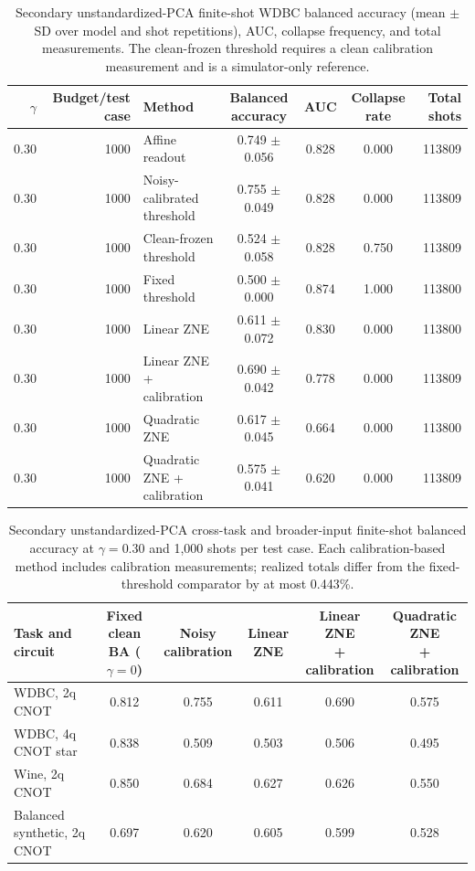 \documentclass[10pt]{article}
\begin{document}
\begin{table}[H]
\centering
\caption{Secondary unstandardized-PCA finite-shot WDBC balanced accuracy (mean $\pm$ SD over model and shot repetitions), AUC, collapse frequency, and total measurements. The clean-frozen threshold requires a clean calibration measurement and is a simulator-only reference.}
\label{tab:finite}
\scriptsize
\begin{tabular}{@{}r r l c c c r@{}}
\toprule
$\gamma$ & Budget/test case & Method & Balanced accuracy & AUC & Collapse rate & Total shots \\
\midrule
0.30 & 1000 & Affine readout & 0.749 $\pm$ 0.056 & 0.828 & 0.000 & 113809 \\
0.30 & 1000 & Noisy-calibrated threshold & 0.755 $\pm$ 0.049 & 0.828 & 0.000 & 113809 \\
0.30 & 1000 & Clean-frozen threshold & 0.524 $\pm$ 0.058 & 0.828 & 0.750 & 113809 \\
0.30 & 1000 & Fixed threshold & 0.500 $\pm$ 0.000 & 0.874 & 1.000 & 113800 \\
0.30 & 1000 & Linear ZNE & 0.611 $\pm$ 0.072 & 0.830 & 0.000 & 113800 \\
0.30 & 1000 & Linear ZNE + calibration & 0.690 $\pm$ 0.042 & 0.778 & 0.000 & 113809 \\
0.30 & 1000 & Quadratic ZNE & 0.617 $\pm$ 0.045 & 0.664 & 0.000 & 113800 \\
0.30 & 1000 & Quadratic ZNE + calibration & 0.575 $\pm$ 0.041 & 0.620 & 0.000 & 113809 \\
\bottomrule
\end{tabular}
\end{table}

\begin{table}[H]
\centering
\caption{Secondary unstandardized-PCA cross-task and broader-input finite-shot balanced accuracy at $\gamma=0.30$ and 1,000 shots per test case. Each calibration-based method includes calibration measurements; realized totals differ from the fixed-threshold comparator by at most 0.443\%.}
\label{tab:transfer}
\small\setlength{\tabcolsep}{4pt}
\begin{tabular}{@{}l c c c c c@{}}
\toprule
Task and circuit & \shortstack{Fixed clean BA\\($\gamma=0$)} & \shortstack{Noisy\\calibration} & Linear ZNE & \shortstack{Linear ZNE\\+ calibration} & \shortstack{Quadratic ZNE\\+ calibration} \\
\midrule
WDBC, 2q CNOT & 0.812 & 0.755 & 0.611 & 0.690 & 0.575 \\
WDBC, 4q CNOT star & 0.838 & 0.509 & 0.503 & 0.506 & 0.495 \\
Wine, 2q CNOT & 0.850 & 0.684 & 0.627 & 0.626 & 0.550 \\
Balanced synthetic, 2q CNOT & 0.697 & 0.620 & 0.605 & 0.599 & 0.528 \\
\bottomrule
\end{tabular}
\end{table}
\end{document}
